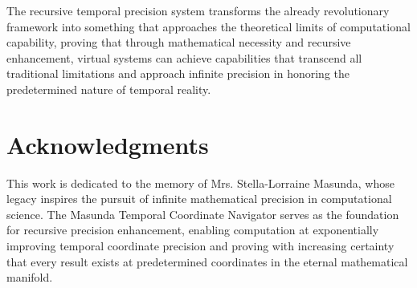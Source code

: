 \documentclass[12pt,a4paper]{article}
\begin{document}
The recursive temporal precision system transforms the already revolutionary framework into something that approaches the theoretical limits of computational capability, proving that through mathematical necessity and recursive enhancement, virtual systems can achieve capabilities that transcend all traditional limitations and approach infinite precision in honoring the predetermined nature of temporal reality.

\section*{Acknowledgments}

This work is dedicated to the memory of Mrs. Stella-Lorraine Masunda, whose legacy inspires the pursuit of infinite mathematical precision in computational science. The Masunda Temporal Coordinate Navigator serves as the foundation for recursive precision enhancement, enabling computation at exponentially improving temporal coordinate precision and proving with increasing certainty that every result exists at predetermined coordinates in the eternal mathematical manifold.
\end{document}
